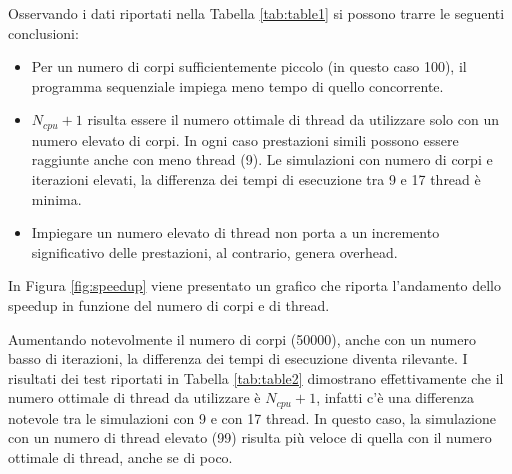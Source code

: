 \documentclass[12pt,a4paper,openright,twoside]{book}
\begin{document}
Osservando i dati riportati nella Tabella \ref{tab:table1}
si possono trarre le seguenti conclusioni:
\begin{itemize}
	\item Per un numero di corpi sufficientemente piccolo (in questo caso 100),
	il programma sequenziale impiega meno tempo di quello concorrente.
	\item $N_{cpu}+1$ risulta essere il numero ottimale di thread da utilizzare
	solo con un numero elevato di corpi. In ogni caso prestazioni simili possono essere raggiunte anche con meno thread (9).
	Le simulazioni con numero di corpi e iterazioni elevati, la differenza dei tempi di esecuzione tra 9 e 17 thread è minima.
	\item Impiegare un numero elevato di thread non porta a un incremento significativo delle prestazioni, al contrario, genera overhead.
\end{itemize}

In Figura \ref{fig:speedup} viene presentato un grafico che riporta l'andamento dello speedup in funzione del numero di corpi e di thread.

Aumentando notevolmente il numero di corpi (50000), anche con un numero basso di iterazioni,
la differenza dei tempi di esecuzione diventa rilevante.
I risultati dei test riportati in Tabella \ref{tab:table2} dimostrano effettivamente che
il numero ottimale di thread da utilizzare è $N_{cpu} + 1$, infatti c'è una differenza notevole tra le simulazioni con 9 e con 17 thread. 
In questo caso, la simulazione con un numero di thread elevato (99) risulta più veloce di quella con il numero ottimale di thread, anche se di poco.
\end{document}
